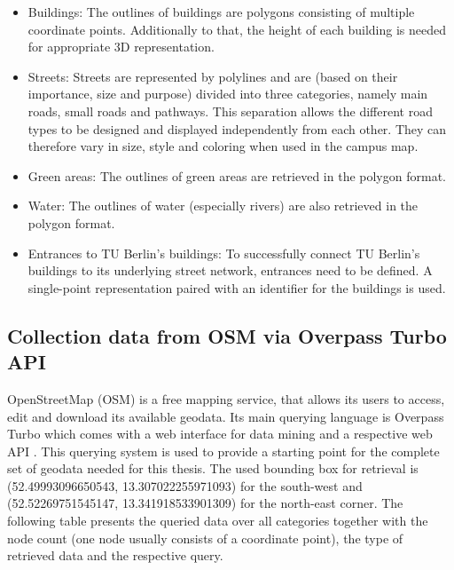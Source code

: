 \begin{itemize}
    \item Buildings: The outlines of buildings are polygons consisting of multiple coordinate points. Additionally to that, the height of each building is needed for appropriate 3D representation.
    \item Streets: Streets are represented by polylines and are (based on their importance, size and purpose) divided into three categories, namely main roads, small roads and pathways. This separation allows the different road types to be designed and displayed independently from each other. They can therefore vary in size, style and coloring when used in the campus map.
    \item Green areas: The outlines of green areas are retrieved in the polygon format.
    \item Water: The outlines of water (especially rivers) are also retrieved in the polygon format.
    \item Entrances to TU Berlin's buildings: To successfully connect TU Berlin's buildings to its underlying street network, entrances need to be defined. A single-point representation paired with an identifier for the buildings is used.
\end{itemize}

\subsection{Collection data from OSM via Overpass Turbo API}
OpenStreetMap (OSM) is a free mapping service, that allows its users to access, edit and download its available geodata. Its main querying language is Overpass Turbo which comes with a web interface for data mining and a respective web API \cite{openstreetmap_overpass_turbo}. This querying system is used to provide a starting point for the complete set of geodata needed for this thesis. The used bounding box for retrieval is (52.49993096650543, 13.307022255971093) for the south-west and (52.52269751545147, 13.341918533901309) for the north-east corner. The following table presents the queried data over all categories together with the node count (one node usually consists of a coordinate point), the type of retrieved data and the respective query.


